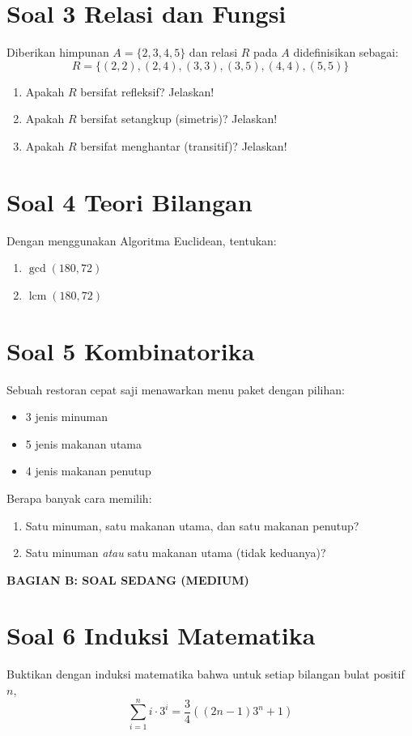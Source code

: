 \documentclass[12pt,a4paper]{article}
\begin{document}
\section*{Soal 3 Relasi dan Fungsi}
Diberikan himpunan $A = \{2, 3, 4, 5\}$ dan relasi $R$ pada $A$ didefinisikan sebagai:
$$R = \{(2,2), (2,4), (3,3), (3,5), (4,4), (5,5)\}$$
\begin{enumerate}[label=(\alph*)]
    \item Apakah $R$ bersifat refleksif? Jelaskan!
    \item Apakah $R$ bersifat setangkup (simetris)? Jelaskan!
    \item Apakah $R$ bersifat menghantar (transitif)? Jelaskan!
\end{enumerate}

\section*{Soal 4 Teori Bilangan}
Dengan menggunakan Algoritma Euclidean, tentukan:
\begin{enumerate}[label=(\alph*)]
    \item $\gcd(180, 72)$
    \item $\operatorname{lcm}(180, 72)$
\end{enumerate}

\section*{Soal 5 Kombinatorika}
Sebuah restoran cepat saji menawarkan menu paket dengan pilihan:
\begin{itemize}
    \item 3 jenis minuman
    \item 5 jenis makanan utama
    \item 4 jenis makanan penutup
\end{itemize}
Berapa banyak cara memilih:
\begin{enumerate}[label=(\alph*)]
    \item Satu minuman, satu makanan utama, dan satu makanan penutup?
    \item Satu minuman \emph{atau} satu makanan utama (tidak keduanya)?
\end{enumerate}

\newpage
\begin{center}
\large \textbf{BAGIAN B: SOAL SEDANG (MEDIUM)}
\end{center}

\section*{Soal 6 Induksi Matematika}
Buktikan dengan induksi matematika bahwa untuk setiap bilangan bulat positif $n$,
$$\sum_{i=1}^{n} i \cdot 3^i = \frac{3}{4}\left((2n-1)3^n + 1\right)$$
\end{document}
